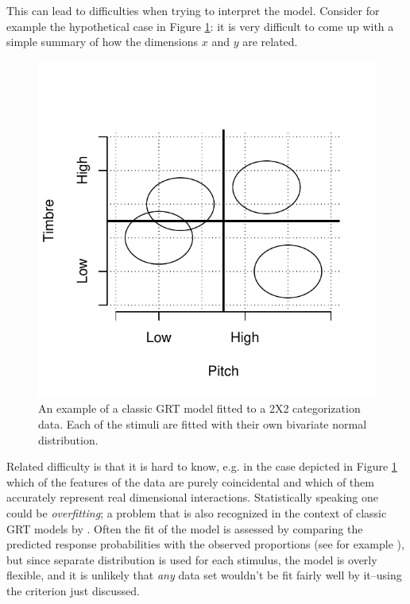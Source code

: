 \documentclass{article}\usepackage{knitr}
\begin{document}
This can lead to difficulties when trying to interpret the model. Consider for example the hypothetical case in Figure \ref{fig:classicGRT}: it is very difficult to come up with a simple summary of how the dimensions $x$ and $y$ are related.

\begin{figure}[!htb]
\centering
\begin{knitrout}
\color{fgcolor}
\includegraphics[width=\maxwidth]{figure/unnamed-chunk-11-1} 

\end{knitrout}
\caption{An example of a classic GRT model fitted to a 2X2 categorization data. Each of the stimuli are fitted with their own bivariate normal distribution.}
\label{fig:classicGRT}
\end{figure} 

Related difficulty is that it is hard to know, e.g. in the case depicted in Figure \ref{fig:classicGRT} which of the features of the data are purely coincidental and which of them accurately represent real dimensional interactions. Statistically speaking one could be \textit{overfitting}; a problem that is also recognized in the context of classic GRT models by \cite{soto2017}. Often the fit of the model is assessed by comparing the predicted response probabilities with the observed proportions (see for example \citet[Figure 4]{silbert2009}), but since separate distribution is used for each stimulus, the model is overly flexible, and it is unlikely that \textit{any} data set wouldn't be fit fairly well by it--using the criterion just discussed.
\end{document}
